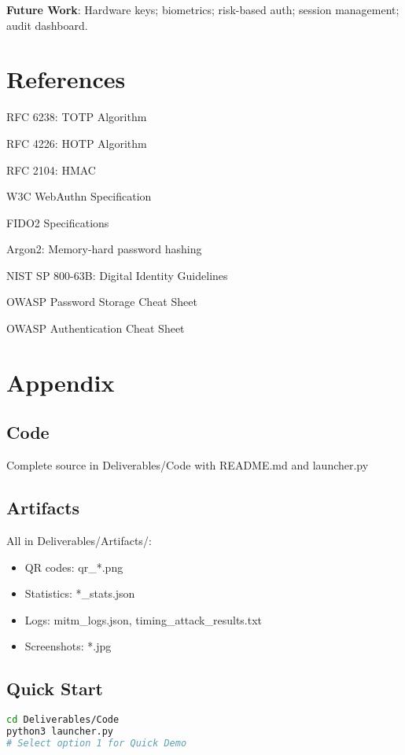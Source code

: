 \documentclass[12pt,a4paper]{article}
\begin{document}
\textbf{Future Work}: Hardware keys; biometrics; risk-based auth; session management; audit dashboard.

\section{References}

\begin{enumerate}[label={[\arabic*]}]
\item RFC 6238: TOTP Algorithm
\item RFC 4226: HOTP Algorithm
\item RFC 2104: HMAC
\item W3C WebAuthn Specification
\item FIDO2 Specifications
\item Argon2: Memory-hard password hashing
\item NIST SP 800-63B: Digital Identity Guidelines
\item OWASP Password Storage Cheat Sheet
\item OWASP Authentication Cheat Sheet
\end{enumerate}

\appendix
\section{Appendix}

\subsection{Code}
Complete source in Deliverables/Code with README.md and launcher.py

\subsection{Artifacts}
All in Deliverables/Artifacts/:
\begin{itemize}
\item QR codes: qr\_*.png
\item Statistics: *\_stats.json
\item Logs: mitm\_logs.json, timing\_attack\_results.txt
\item Screenshots: *.jpg
\end{itemize}

\subsection{Quick Start}
\begin{lstlisting}[language=bash]
cd Deliverables/Code
python3 launcher.py
# Select option 1 for Quick Demo
\end{lstlisting}
\end{document}
